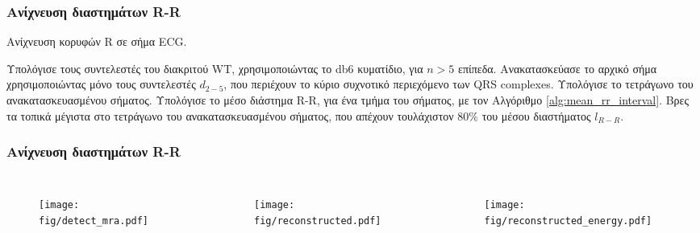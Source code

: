 \documentclass{beamer}
\begin{document}
\begin{frame}
\frametitle{Ανίχνευση διαστημάτων R-R}

\begin{algorithm}[H]
  \scriptsize
  \caption{Ανίχνευση κορυφών R σε σήμα ECG.}
  \label{alg:detect_rr_intervals}  
  \begin{algorithmic}[1]  
  	
  	\State Υπολόγισε τους συντελεστές του διακριτού WT, χρησιμοποιώντας το db6 κυματίδιο, για $n>5$ επίπεδα.
  	\State Ανακατασκεύασε το αρχικό σήμα χρησιμοποιώντας μόνο τους συντελεστές $d_{2-5}$, που περιέχουν το κύριο συχνοτικό περιεχόμενο των QRS complexes.
  	\State Υπολόγισε το τετράγωνο του ανακατασκευασμένου σήματος.
  	\State Υπολόγισε το μέσο διάστημα R-R, για ένα τμήμα του σήματος, με τον Αλγόριθμο \ref{alg:mean_rr_interval}.
  	\State Βρες τα τοπικά μέγιστα στο τετράγωνο του ανακατασκευασμένου σήματος, που απέχουν τουλάχιστον $80\%$ του μέσου διαστήματος $l_{R-R}$.
  	
  \end{algorithmic}  
\end{algorithm}
\end{frame}

\begin{frame}
\frametitle{Ανίχνευση διαστημάτων R-R}

\begin{columns}

\centering
{}
\begin{figure}
\texttt{[image: fig/detect\_mra.pdf]}
\end{figure}

\begin{figure}
\texttt{[image: fig/reconstructed.pdf]}
\end{figure}
\begin{figure}
\texttt{[image: fig/reconstructed\_energy.pdf]}
\end{figure}
\end{columns}

\end{frame}


\end{document}
